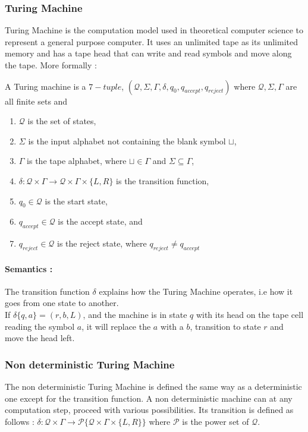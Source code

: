 \subsubsection{Turing Machine}
Turing Machine is the computation model used in theoretical computer science to represent a general purpose computer. It uses an unlimited tape as its unlimited memory and has a tape head that can write and read symbols and move along the tape.  More formally : 
\begin{defn}
A Turing machine is a $7-tuple$, $(\mathcal{Q}, \Sigma, \Gamma, \delta,q_0, q_{accept}, q_{reject})$ where $\mathcal{Q}, \Sigma, \Gamma$ are all finite sets and
\begin{enumerate}
    \item $\mathcal{Q}$ is the set of states, 
    \item $\Sigma$ is the input alphabet not containing the blank symbol  $\sqcup$,
    \item $\Gamma$ is the tape alphabet, where $\sqcup \in \Gamma$ and $\Sigma \subseteq \Gamma$, 
    \item $\delta : \mathcal{Q} \times \Gamma \rightarrow  \mathcal{Q} \times \Gamma \times \{L, R\}$ is the transition function, 
    \item $q_0 \in \mathcal{Q}$ is the start state,
    \item $q_{accept} \in \mathcal{Q}$ is the accept state, and 
    \item $q_{reject} \in \mathcal{Q}$ is the reject state, where $q_{reject} \neq q_{accept}$
\end{enumerate}

\paragraph{Semantics :} The transition function $\delta$ explains how the Turing Machine operates, i.e how it goes from one state to another. \\
If $\delta\{q,a\} = (r,b,L)$, and the machine is in state $q$ with its head on the tape cell reading the symbol $a$, it will replace the $a$ with a $b$, transition to state $r$ and move the head left.
\end{defn}

\subsubsection{Non deterministic Turing Machine}
The non deterministic Turing Machine is defined the same way as a deterministic one except for the transition function. A non deterministic machine can at any computation step, proceed with various possibilities. Its transition is defined as follows :
$\delta : \mathcal{Q} \times \Gamma \rightarrow  \mathcal{P}\{\mathcal{Q} \times \Gamma \times \{L, R\}\}$ where $\mathcal{P}$ is the power set of $\mathcal{Q}$.

